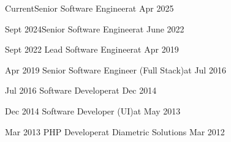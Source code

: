 %
%
%
\begin{experiences}
    \experiencenew
    {Current}{Senior Software Engineer}{at {}}
    {Apr 2025}

    \experiencenew
    {Sept 2024}{Senior Software Engineer}{at {}}
    {June 2022}
    
    \experiencenew
    {Sept 2022}     {Lead Software Engineer}{at {}}
    {Apr 2019}
    
    \experiencenew
    {Apr 2019}     {Senior Software Engineer (Full Stack)}{at {}}
    {Jul 2016}
    
    \experiencenew
    {Jul 2016}     {Software Developer}{at {}}
    {Dec 2014}

    \experiencenew
    {Dec 2014}     {Software Developer (UI)}{at {}}
    {May 2013}
    
    \experiencenewlast
    {Mar 2013}     {PHP Developer}{at Diametric Solutions}
    {Mar 2012}
\end{experiences}